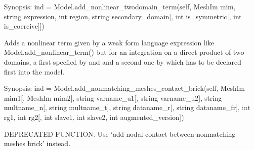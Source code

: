 \documentclass[a4paper,11pt,english]{sphinxmanual}
\begin{document}
\begin{fulllineitems}
\begin{fulllineitems}
\end{fulllineitems}


\begin{fulllineitems}
\label{\detokenize{python/cmdref_Model:getfem.Model.add_nonlinear_twodomain_term}}
Synopsis: ind = Model.add\_nonlinear\_twodomain\_term(self, MeshIm mim, string expression, int region, string secondary\_domain{[}, int is\_symmetric{[}, int is\_coercive{]}{]})

Adds a nonlinear term given by a weak form language expression like
Model.add\_nonlinear\_term() but for an integration on a direct
product of two domains, a first specfied by  and 
and a second one by  which has to be declared
first into the model.

\end{fulllineitems}


\begin{fulllineitems}
\label{\detokenize{python/cmdref_Model:getfem.Model.add_nonmatching_meshes_contact_brick}}
Synopsis: ind = Model.add\_nonmatching\_meshes\_contact\_brick(self,  MeshIm mim1{[}, MeshIm mim2{]}, string varname\_u1{[}, string varname\_u2{]}, string multname\_n{[}, string multname\_t{]}, string dataname\_r{[}, string dataname\_fr{]}, int rg1, int rg2{[}, int slave1, int slave2,  int augmented\_version{]})

DEPRECATED FUNCTION. Use ‘add nodal contact between nonmatching meshes brick’ instead.

\end{fulllineitems}


\end{fulllineitems}
\end{document}
